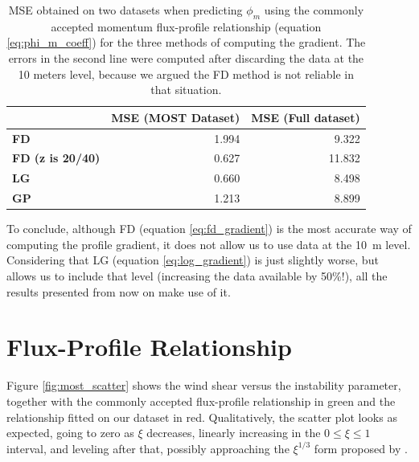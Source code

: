 \documentclass[a4paper,11pt]{kth-mag}
\begin{document}
\begin{table}[]
\centering
\caption{MSE obtained on two datasets when predicting $\phi_m$ using the commonly accepted momentum flux-profile relationship (equation \ref{eq:phi_m_coeff}) for the three methods of computing the gradient. The errors in the second line were computed after discarding the data at the 10 meters level, because we argued the FD method is not reliable in that situation.}
\label{tbl:gradient_errors}
\begin{tabular}{l|r|r}
\toprule
& \textbf{MSE (MOST Dataset) } &\textbf{ MSE (Full dataset) }\\
\midrule
\textbf{FD} & 1.994 & 9.322 \\
\textbf{FD (z is 20/40) } & 0.627  & 11.832 \\
\textbf{LG } & 0.660 & 8.498 \\
\textbf{GP} & 1.213 & 8.899 \\
\bottomrule
\end{tabular}
\end{table}

To conclude, although FD (equation \ref{eq:fd_gradient}) is the most accurate way of computing the profile gradient, it does not allow us to use data at the \SI{10}{\meter} level. Considering that LG (equation \ref{eq:log_gradient}) is just slightly worse, but allows us to include that level (increasing the data available by 50\%!), all the results presented from now on make use of it.


\section{Flux-Profile Relationship}
\label{sec:most_res}
Figure \ref{fig:most_scatter} shows the wind shear versus the instability parameter, together with the commonly accepted flux-profile relationship in green and the relationship fitted on our dataset in red. Qualitatively, the scatter plot looks as expected, going to zero as $\xi$ decreases, linearly increasing in the $0\leq\xi\leq1$ interval, and leveling after that, possibly approaching the $\xi^{1/3}$ form proposed by \cite{sheba_phim}.
\end{document}

